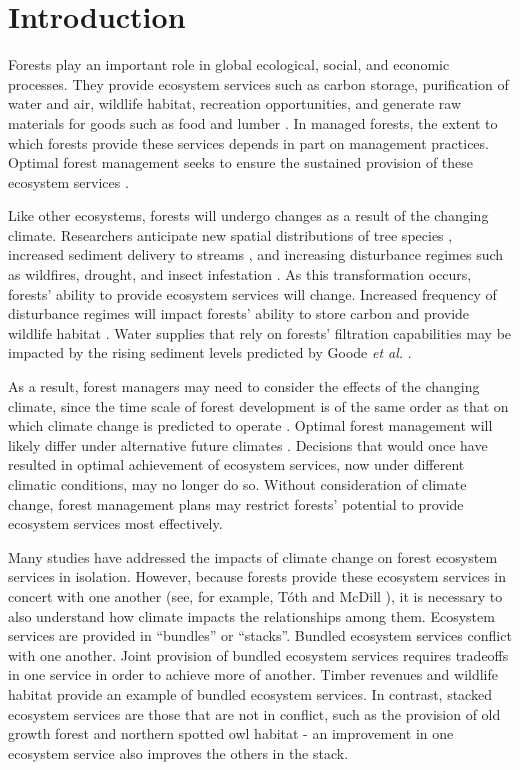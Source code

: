 
\section{Introduction}
 
Forests play an important role in global ecological, social, and economic processes. They provide ecosystem services such as carbon storage, purification of water and air, wildlife habitat, recreation opportunities, and generate raw materials for goods such as food and lumber \cite{daily1997ecosystem}. In managed forests, the extent to which forests provide these services depends in part on management practices. Optimal forest management seeks to ensure the sustained provision of these ecosystem services \cite{cfrForestMgmt}.

Like other ecosystems, forests will undergo changes as a result of the changing climate. Researchers anticipate new spatial distributions of tree species \cite{iverson1998predicting}, increased sediment delivery to streams \cite{Goode20121}, and increasing disturbance regimes such as wildfires, drought, and insect infestation \cite{vose2012effects}. As this transformation occurs, forests' ability to provide ecosystem services will change. Increased frequency of disturbance regimes will impact forests' ability to store carbon \cite{bonan2008forests} and provide wildlife habitat \cite{mckenzie2004climatic}. Water supplies that rely on forests' filtration capabilities may be impacted by the rising sediment levels predicted by Goode \textit{et al.} \cite{Goode20121}.

As a result, forest managers may need to consider the effects of the changing climate, since the time scale of forest development is of the same order as that on which climate change is predicted to operate \cite{ipcc2013climate}. Optimal forest management will likely differ under alternative future climates \cite{linder2000developing}. Decisions that would once have resulted in optimal achievement of ecosystem services, now under different climatic conditions, may no longer do so. Without consideration of climate change, forest management plans may restrict forests' potential to provide ecosystem services most effectively.

Many studies have addressed the impacts of climate change on forest ecosystem services in isolation\cite{vose2012effects}\cite{bonan2008forests}\cite{mckenzie2004climatic}. However, because forests provide these ecosystem services in concert with one another (see, for example, T{\'o}th and McDill \cite{toth2009finding}), it is necessary to also understand how climate impacts the relationships among them. Ecosystem services are provided in ``bundles'' or ``stacks''. Bundled ecosystem services conflict with one another. Joint provision of bundled ecosystem services requires tradeoffs in one service in order to achieve more of another. Timber revenues and wildlife habitat provide an example of bundled ecosystem services. In contrast, stacked ecosystem services are those that are not in conflict, such as the provision of old growth forest and northern spotted owl habitat - an improvement in one ecosystem service also improves the others in the stack. 

